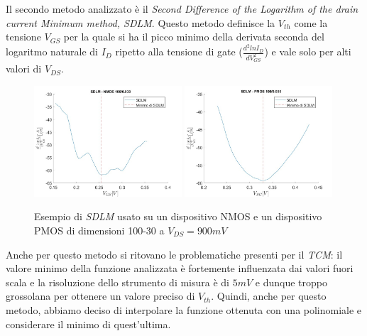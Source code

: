 \documentclass[12pt, letterpaper]{book}
\begin{document}
Il secondo metodo analizzato è il \emph{Second Difference of the Logarithm of the drain current Minimum method, SDLM}. Questo metodo definisce la $V_{th}$ come la tensione $V_{GS}$ per la quale si ha il picco minimo della derivata seconda del logaritmo naturale di $I_D$ ripetto alla tensione di gate ($\frac{d^2lnI_D}{dV_{GS}^2}$) e vale solo per alti valori di $V_{DS}$. \\

\begin{figure}[H]
  \centering
  \includegraphics[width=0.49\textwidth]{SDLM-N4-100-30-NoFit}
  \includegraphics[width=0.49\textwidth]{SDLM-P1-100-30-NoFit}
  \caption{Esempio di \emph{SDLM} usato su un dispositivo NMOS e un dispositivo PMOS di dimensioni 100-30 a $V_{DS} = 900 mV$}
\end{figure}


Anche per questo metodo si ritovano le problematiche presenti per il \emph{TCM}: il valore minimo della funzione analizzata è fortemente influenzata dai valori fuori scala e la risoluzione dello strumento di misura è di $5 mV$ e dunque troppo grossolana per ottenere un valore preciso di $V_{th}$.
Quindi, anche per questo metodo, abbiamo deciso di interpolare la funzione ottenuta con una polinomiale e considerare il minimo di quest'ultima. \\
\end{document}
